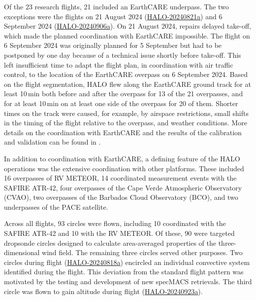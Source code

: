\documentclass[acp, manuscript]{copernicus}
\begin{document}


Of the 23 research flights, 21 included an EarthCARE underpass. The two exceptions were the flights on 21 August 2024 (\href{https://orcestra-campaign.org/reports/HALO-20240821a.html}{HALO-20240821a}) and 6 September 2024 (\href{https://orcestra-campaign.org/reports/HALO-20240906a.html}{HALO-20240906a}).
On 21 August 2024, repairs delayed take-off, which made the planned coordination with EarthCARE impossible.
The flight on 6 September 2024 was originally planned for 5 September but had to be postponed by one day because of a technical issue shortly before take-off. This left insufficient time to adapt the flight plan, in coordination with air traffic control, to the location of the EarthCARE overpass on 6 September 2024.
Based on the flight segmentation, HALO flew along the EarthCARE ground track for at least 10\,min both before and after the overpass for 13 of the 21 overpasses, and for at least 10\,min on at least one side of the overpass for 20 of them.
Shorter times on the track were caused, for example, by airspace restrictions, small shifts in the timing of the flight relative to the overpass, and weather conditions.
More details on the coordination with EarthCARE and the results of the calibration and validation can be found in \citet{grossPersistentEarthCAREUnderflight2026}.

In addition to coordination with EarthCARE, a defining feature of the HALO operations was the extensive coordination with other platforms. These included 16 overpasses of RV METEOR, 14 coordinated measurement events with the SAFIRE ATR-42, four overpasses of the Cape Verde Atmospheric Observatory (CVAO), two overpasses of the Barbados Cloud Observatory (BCO), and two underpasses of the PACE satellite.

Across all flights, 93 circles were flown, including 10 coordinated with the SAFIRE ATR-42 and 10 with the RV METEOR. Of these, 90 were targeted dropsonde circles designed to calculate area-averaged properties of the three-dimensional wind field.
The remaining three circles served other purposes. Two circles during flight
(\href{https://orcestra-campaign.org/reports/HALO-20240818a.html}{HALO-20240818a}) encircled an individual convective system identified during the flight. This deviation from the standard flight pattern was motivated by the testing and development of new specMACS retrievals. 
The third circle was flown to gain altitude during flight (\href{https://orcestra-campaign.org/reports/HALO-20240923a.html}{HALO-20240923a}).
\end{document}
